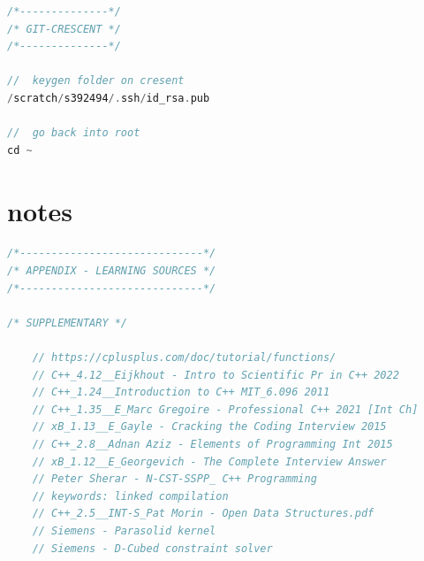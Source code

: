 \documentclass[8pt]{extarticle}
\begin{document}
\begin{small}
\begin{multicols}{2}
\begin{lstlisting}[language=C]
/*--------------*/
/* GIT-CRESCENT */
/*--------------*/

//  keygen folder on cresent
/scratch/s392494/.ssh/id_rsa.pub

//  go back into root
cd ~
\end{lstlisting}

\section*{notes}

\begin{lstlisting}[language=C]
/*-----------------------------*/
/* APPENDIX - LEARNING SOURCES */
/*-----------------------------*/

/* SUPPLEMENTARY */

	// https://cplusplus.com/doc/tutorial/functions/
	// C++_4.12__Eijkhout - Intro to Scientific Pr in C++ 2022
	// C++_1.24__Introduction to C++ MIT_6.096 2011
	// C++_1.35__E_Marc Gregoire - Professional C++ 2021 [Int Ch]
	// xB_1.13__E_Gayle - Cracking the Coding Interview 2015
	// C++_2.8__Adnan Aziz - Elements of Programming Int 2015
	// xB_1.12__E_Georgevich - The Complete Interview Answer
	// Peter Sherar - N-CST-SSPP_ C++ Programming
	// keywords: linked compilation
	// C++_2.5__INT-S_Pat Morin - Open Data Structures.pdf
	// Siemens - Parasolid kernel
	// Siemens - D-Cubed constraint solver
\end{lstlisting}

\vfill\null
\columnbreak
\vfill\null

\end{multicols}
\end{small}
\end{document}
